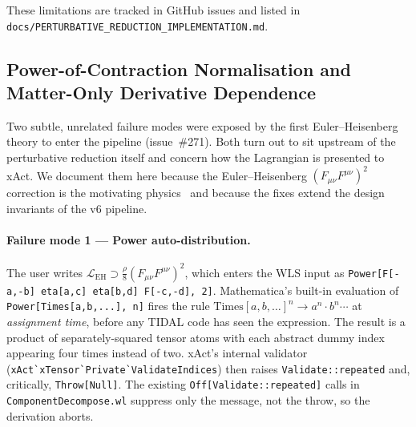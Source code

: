 These limitations are tracked in GitHub issues and listed in \verb|docs/PERTURBATIVE_REDUCTION_IMPLEMENTATION.md|.

\subsection{Power-of-Contraction Normalisation and Matter-Only Derivative Dependence}
\label{sec:pr-eh-cd}

Two subtle, unrelated failure modes were exposed by the first Euler--Heisenberg theory to enter the pipeline (issue~\#271). Both turn out to sit upstream of the perturbative reduction itself and concern how the Lagrangian is presented to xAct. We document them here because the Euler--Heisenberg $(F_{\mu\nu}F^{\mu\nu})^2$ correction is the motivating physics~\cite{HeisenbergEuler1936,Dunne2004} and because the fixes extend the design invariants of the v6 pipeline.

\paragraph{Failure mode 1 --- Power auto-distribution.} The user writes $\mathcal{L}_{\mathrm{EH}} \supset \tfrac{\rho}{8}(F_{\mu\nu}F^{\mu\nu})^2$, which enters the WLS input as \verb|Power[F[-a,-b] eta[a,c] eta[b,d] F[-c,-d], 2]|. Mathematica's built-in evaluation of \verb|Power[Times[a,b,...], n]| fires the rule $\mathrm{Times}[a,b,\dots]^n \rightarrow a^n \cdot b^n \cdots$ at \emph{assignment time}, before any TIDAL code has seen the expression. The result is a product of separately-squared tensor atoms with each abstract dummy index appearing four times instead of two. xAct's internal validator (\verb|xAct`xTensor`Private`ValidateIndices|) then raises \verb|Validate::repeated| and, critically, \verb|Throw[Null]|. The existing \verb|Off[Validate::repeated]| calls in \verb|ComponentDecompose.wl| suppress only the message, not the throw, so the derivation aborts.

